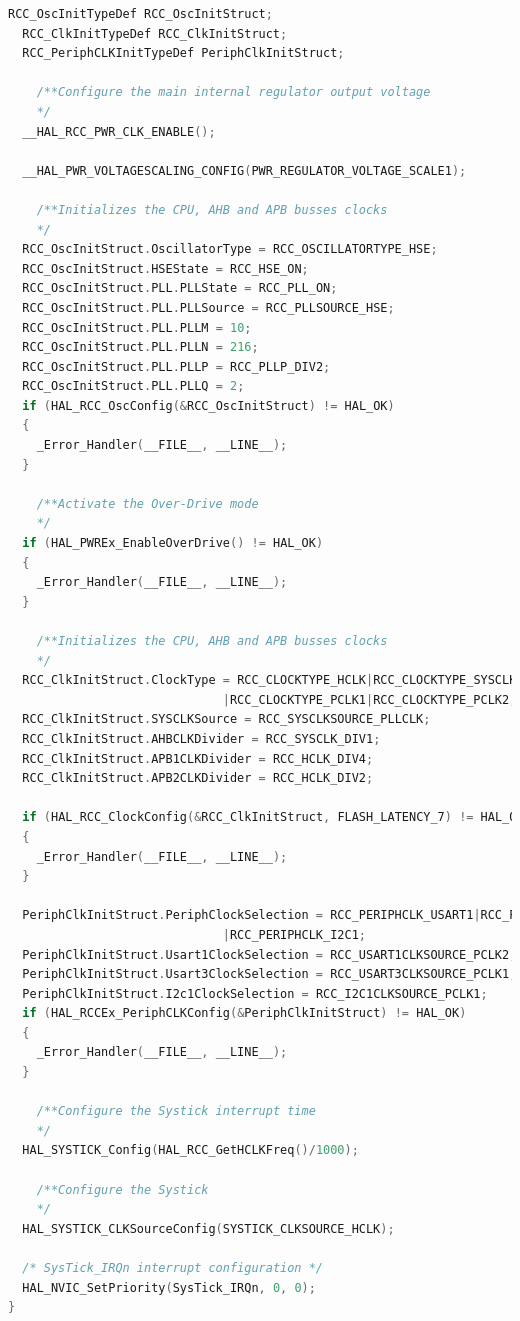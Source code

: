 \begin{lstlisting}[language = c]
  RCC_OscInitTypeDef RCC_OscInitStruct;
  RCC_ClkInitTypeDef RCC_ClkInitStruct;
  RCC_PeriphCLKInitTypeDef PeriphClkInitStruct;

    /**Configure the main internal regulator output voltage 
    */
  __HAL_RCC_PWR_CLK_ENABLE();

  __HAL_PWR_VOLTAGESCALING_CONFIG(PWR_REGULATOR_VOLTAGE_SCALE1);

    /**Initializes the CPU, AHB and APB busses clocks 
    */
  RCC_OscInitStruct.OscillatorType = RCC_OSCILLATORTYPE_HSE;
  RCC_OscInitStruct.HSEState = RCC_HSE_ON;
  RCC_OscInitStruct.PLL.PLLState = RCC_PLL_ON;
  RCC_OscInitStruct.PLL.PLLSource = RCC_PLLSOURCE_HSE;
  RCC_OscInitStruct.PLL.PLLM = 10;
  RCC_OscInitStruct.PLL.PLLN = 216;
  RCC_OscInitStruct.PLL.PLLP = RCC_PLLP_DIV2;
  RCC_OscInitStruct.PLL.PLLQ = 2;
  if (HAL_RCC_OscConfig(&RCC_OscInitStruct) != HAL_OK)
  {
    _Error_Handler(__FILE__, __LINE__);
  }

    /**Activate the Over-Drive mode 
    */
  if (HAL_PWREx_EnableOverDrive() != HAL_OK)
  {
    _Error_Handler(__FILE__, __LINE__);
  }

    /**Initializes the CPU, AHB and APB busses clocks 
    */
  RCC_ClkInitStruct.ClockType = RCC_CLOCKTYPE_HCLK|RCC_CLOCKTYPE_SYSCLK
                              |RCC_CLOCKTYPE_PCLK1|RCC_CLOCKTYPE_PCLK2;
  RCC_ClkInitStruct.SYSCLKSource = RCC_SYSCLKSOURCE_PLLCLK;
  RCC_ClkInitStruct.AHBCLKDivider = RCC_SYSCLK_DIV1;
  RCC_ClkInitStruct.APB1CLKDivider = RCC_HCLK_DIV4;
  RCC_ClkInitStruct.APB2CLKDivider = RCC_HCLK_DIV2;

  if (HAL_RCC_ClockConfig(&RCC_ClkInitStruct, FLASH_LATENCY_7) != HAL_OK)
  {
    _Error_Handler(__FILE__, __LINE__);
  }

  PeriphClkInitStruct.PeriphClockSelection = RCC_PERIPHCLK_USART1|RCC_PERIPHCLK_USART3
                              |RCC_PERIPHCLK_I2C1;
  PeriphClkInitStruct.Usart1ClockSelection = RCC_USART1CLKSOURCE_PCLK2;
  PeriphClkInitStruct.Usart3ClockSelection = RCC_USART3CLKSOURCE_PCLK1;
  PeriphClkInitStruct.I2c1ClockSelection = RCC_I2C1CLKSOURCE_PCLK1;
  if (HAL_RCCEx_PeriphCLKConfig(&PeriphClkInitStruct) != HAL_OK)
  {
    _Error_Handler(__FILE__, __LINE__);
  }

    /**Configure the Systick interrupt time 
    */
  HAL_SYSTICK_Config(HAL_RCC_GetHCLKFreq()/1000);

    /**Configure the Systick 
    */
  HAL_SYSTICK_CLKSourceConfig(SYSTICK_CLKSOURCE_HCLK);

  /* SysTick_IRQn interrupt configuration */
  HAL_NVIC_SetPriority(SysTick_IRQn, 0, 0);
}


\end{lstlisting}
